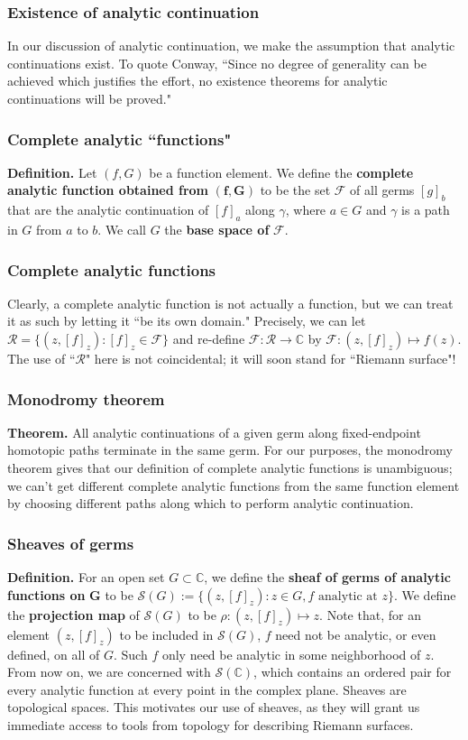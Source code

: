 \documentclass{beamer}
\newcommand{\ra}{\rightarrow}
\newcommand{\cs}{\mathbb{C}}
\begin{document}
	\begin{frame}
		\frametitle{Existence of analytic continuation}
		In our discussion of analytic continuation, we make the assumption that analytic continuations exist. To quote Conway, ``Since no degree of generality can be achieved which justifies the effort, no existence theorems for analytic continuations will be proved."
	\end{frame}

	\begin{frame}
		\frametitle{Complete analytic ``functions"}
		\textbf{Definition.} Let $(f, G)$ be a function element. We define the  \textbf{complete analytic function obtained from} $\boldsymbol{(f, G)}$ to be the set $\mathscr F$ of all germs $[g]_b$ that are the analytic continuation of $[f]_a$ along $\gamma$, where $a \in G$ and $\gamma$ is a path in $G$ from $a$ to $b$.
		\vskip0.2in
		We call $G$ the \textbf{base space of} $\boldsymbol{\mathscr F}$.
	\end{frame}

	\begin{frame}
		\frametitle{Complete analytic functions}
		Clearly, a complete analytic function is not actually a function, but we can treat it as such by letting it ``be its own domain." Precisely, we can let $\mathscr R = \{(z, [f]_z) : [f]_z \in \mathscr F\}$ and re-define $\mathscr F : \mathscr R \ra \cs$ by $\mathscr F : (z, [f]_z) \mapsto f(z)$.
		\vskip0.2in
		The use of ``$\mathscr R$" here is not coincidental; it will soon stand for ``Riemann surface"!
	\end{frame}

	\begin{frame}
		\frametitle{Monodromy theorem}
		\textbf{Theorem.} All analytic continuations of a given germ along fixed-endpoint homotopic paths terminate in the same germ.
		\vskip0.2in
		For our purposes, the monodromy theorem gives that our definition of complete analytic functions is unambiguous; we can't get different complete analytic functions from the same function element by choosing different paths along which to perform analytic continuation.
	\end{frame}

	\begin{frame}
		\frametitle{Sheaves of germs}
		\textbf{Definition.} For an open set $G \subset \cs$, we define the \textbf{sheaf of germs of analytic functions on} $\boldsymbol G$ to be
		$\mathscr{S}(G) := \{(z, [f]_z) : z \in G, f \text{ analytic at } z\}$. 
		\vskip0.2in
		We define the \textbf{projection map} of $\mathscr S(G)$ to be $\rho : (z, [f]_z) \mapsto z$.
		\vskip0.2in
		Note that, for an element $(z, [f]_z)$ to be included in $\mathscr S(G)$, $f$ need not be analytic, or even defined, on all of $G$. Such $f$ only need be analytic in some neighborhood of $z$. From now on, we are concerned with $\mathscr S(\cs)$, which contains an ordered pair for every analytic function at every point in the complex plane.
		\vskip0.2in
		Sheaves are topological spaces. This motivates our use of sheaves, as they will grant us immediate access to tools from topology for describing Riemann surfaces.
	\end{frame}
\end{document}
